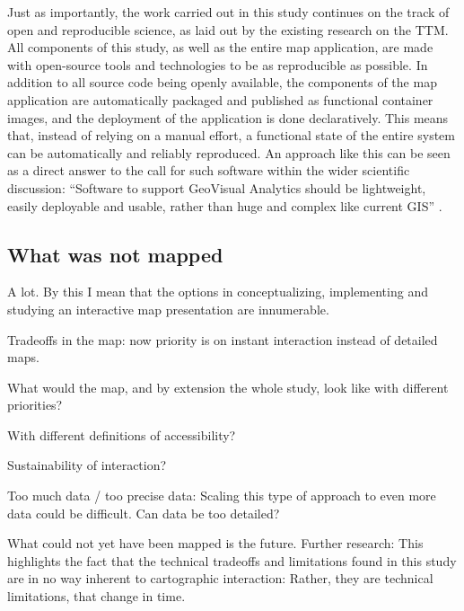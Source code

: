 Just as importantly,
the work carried out in this study continues on the track of open and reproducible science,
as laid out by the existing research on the TTM.
All components of this study, as well as the entire map application, are made
with open-source tools and technologies to be as reproducible as possible.
In addition to all source code being openly available,
the components of the map application are
automatically packaged and published as functional container images,
and the deployment of the application is done declaratively.
This means that, instead of relying on a manual effort,
a functional state of the entire system can be automatically and reliably reproduced.
An approach like this can be seen as a direct answer to the call for such software
within the wider scientific discussion:
\enquote{Software to support GeoVisual Analytics should be lightweight,
easily deployable and usable, rather than huge and complex like current GIS}
\parencite[p.~1596]{and2010}.


\subsection{What was not mapped}

A lot. By this I mean that the options in
conceptualizing, implementing and studying an interactive map presentation are innumerable.

Tradeoffs in the map:
now priority is on instant interaction instead of detailed maps.

What would the map, and by extension the whole study, look like with different priorities?

With different definitions of accessibility?

Sustainability of interaction?

Too much data / too precise data:
Scaling this type of approach to even more data could be difficult.
Can data be too detailed?


What could not yet have been mapped is the future.
Further research:
This highlights the fact that the technical tradeoffs and limitations found in this study
are in no way inherent to cartographic interaction:
Rather, they are technical limitations, that change in time.
